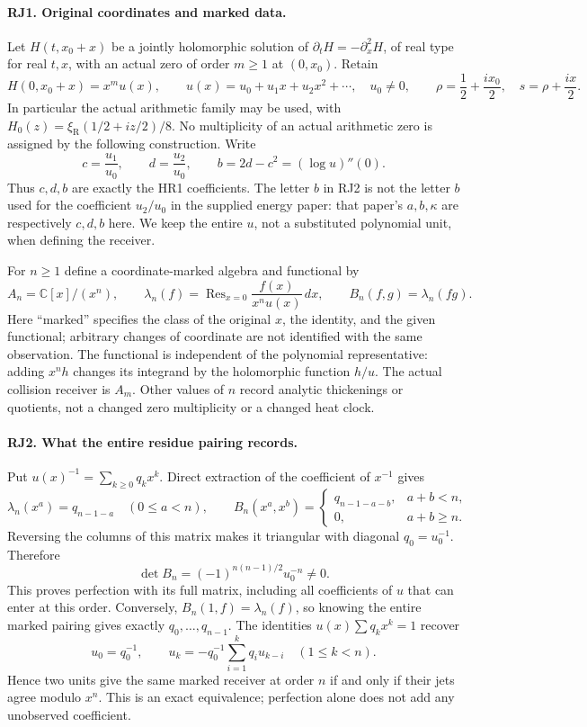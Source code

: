 \paragraph{RJ1. Original coordinates and marked data.}
Let $H(t,x_0+x)$ be a jointly holomorphic solution of
$\partial_tH=-\partial_x^2H$, of real type for real $t,x$, with an
actual zero of order $m\ge1$ at $(0,x_0)$. Retain
\[
 H(0,x_0+x)=x^m u(x),\qquad
 u(x)=u_0+u_1x+u_2x^2+\cdots,\quad u_0\ne0,
 \qquad \rho=\frac12+\frac{ix_0}{2},\quad s=\rho+\frac{ix}{2}.
 \tag{RJ1}
\]
In particular the actual arithmetic family may be used, with
$H_0(z)=\xi_{\mathrm R}(1/2+iz/2)/8$. No multiplicity of an
actual arithmetic zero is assigned by the following construction.
Write
\[
 c=\frac{u_1}{u_0},\qquad d=\frac{u_2}{u_0},\qquad
 b=2d-c^2=(\log u)''(0).
 \tag{RJ2}
\]
Thus $c,d,b$ are exactly the HR1 coefficients. The letter $b$ in
RJ2 is not the letter $b$ used for the coefficient $u_2/u_0$ in the
supplied energy paper: that paper's $a,b,\kappa$ are respectively
$c,d,b$ here. We keep the entire $u$, not a substituted polynomial
unit, when defining the receiver.

For $n\ge1$ define a coordinate-marked algebra and functional by
\[
 A_n=\mathbb C[x]/(x^n),\qquad
 \lambda_n(f)=\operatorname{Res}_{x=0}
          \frac{f(x)}{x^n u(x)}\,dx,\qquad
 B_n(f,g)=\lambda_n(fg).
 \tag{RJ3}
\]
Here ``marked'' specifies the class of the original $x$, the identity,
and the given functional; arbitrary changes of coordinate are not
identified with the same observation. The functional is independent
of the polynomial representative: adding $x^nh$ changes its integrand
by the holomorphic function $h/u$. The actual collision receiver is
$A_m$. Other values of $n$ record analytic thickenings or quotients,
not a changed zero multiplicity or a changed heat clock.

\paragraph{RJ2. What the entire residue pairing records.}
Put $u(x)^{-1}=\sum_{k\ge0}q_kx^k$. Direct extraction of the
coefficient of $x^{-1}$ gives
\[
 \lambda_n(x^a)=q_{n-1-a}\quad(0\le a<n),\qquad
 B_n(x^a,x^b)=
 \begin{cases}q_{n-1-a-b},&a+b<n,\\0,&a+b\ge n.\end{cases}
 \tag{RJ4}
\]
Reversing the columns of this matrix makes it triangular with diagonal
$q_0=u_0^{-1}$. Therefore
\[
 \det B_n=(-1)^{n(n-1)/2}u_0^{-n}\ne0.
 \tag{RJ5}
\]
This proves perfection with its full matrix, including all coefficients
of $u$ that can enter at this order. Conversely, $B_n(1,f)=\lambda_n(f)$,
so knowing the entire marked pairing gives exactly $q_0,\ldots,q_{n-1}$.
The identities $u(x)\sum q_kx^k=1$ recover
\[
 u_0=q_0^{-1},\qquad
 u_k=-q_0^{-1}\sum_{i=1}^k q_i u_{k-i}\quad(1\le k<n).
 \tag{RJ6}
\]
Hence two units give the same marked receiver at order $n$ if and
only if their jets agree modulo $x^n$. This is an exact equivalence;
perfection alone does not add any unobserved coefficient.

